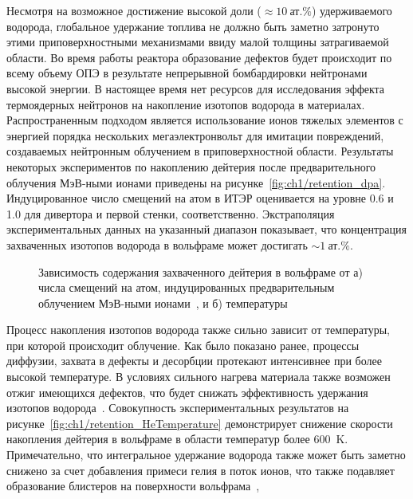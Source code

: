 Несмотря на возможное достижение высокой доли (\( \approx \SI{10}{\text{ат.}\percent} \)) удерживаемого водорода, глобальное удержание топлива не должно быть заметно затронуто этими приповерхностными механизмами ввиду малой толщины затрагиваемой области. Во время работы реактора образование дефектов будет происходит по всему объему ОПЭ в результате непрерывной бомбардировки нейтронами высокой энергии. В настоящее время нет ресурсов для исследования эффекта термоядерных нейтронов на накопление изотопов водорода в материалах. Распространенным подходом является использование ионов тяжелых элементов с энергией порядка нескольких мегаэлектронвольт для имитации повреждений, создаваемых нейтронным облучением в приповерхностной области. Результаты некоторых экспериментов по накоплению дейтерия после предварительного облучения МэВ-ными ионами приведены на рисунке~\cref{fig:ch1/retention_dpa}. Индуцированное число смещений на атом в ИТЭР оценивается на уровне \num{0.6} и \num{1.0} для дивертора и первой стенки, соответственно. Экстраполяция экспериментальных данных на указанный диапазон показывает, что концентрация захваченных изотопов водорода в вольфраме может достигать \( \sim \SI{1}{\text{ат.}\percent} \). 

\begin{figure}[ht]
    \caption{Зависимость содержания захваченного дейтерия в вольфраме от а) числа смещений на атом, индуцированных предварительным облучением МэВ-ными ионами~\cite{Roth2011}, и б) температуры~\cite{Rieth2019}}
\end{figure}

Процесс накопления изотопов водорода также сильно зависит от температуры, при которой происходит облучение. Как было показано ранее, процессы диффузии, захвата в дефекты и десорбции протекают интенсивнее при более высокой температуре. В условиях сильного нагрева материала также возможен отжиг имеющихся дефектов, что будет снижать эффективность удержания изотопов водорода~\cite{Dark2024}. Совокупность экспериментальных результатов на рисунке~\cref{fig:ch1/retention_HeTemperature} демонстрирует снижение скорости накопления дейтерия в вольфраме в области температур более \SI{600}{\kelvin}. Примечательно, что интегральное удержание водорода также может быть заметно снижено за счет добавления примеси гелия в поток ионов, что также подавляет образование блистеров на поверхности вольфрама~\cite{Baldwin2011}, 

